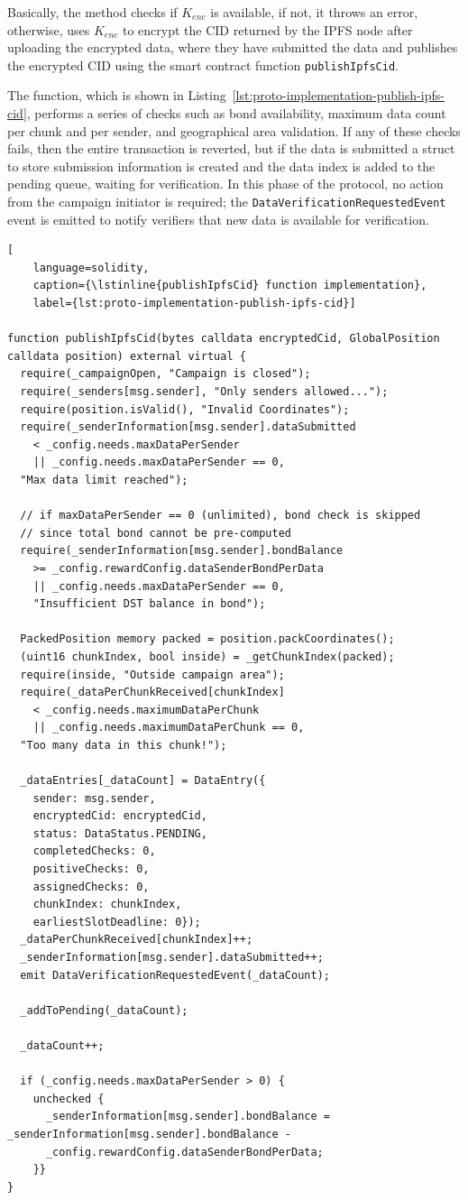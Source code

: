 Basically, the method checks if $K_{enc}$ is available, if not, it throws an error, otherwise, uses $K_{enc}$ to encrypt the CID returned by the IPFS node after uploading the encrypted data, where they have submitted the data and publishes the encrypted CID using the smart contract function \lstinline{publishIpfsCid}.

The function, which is shown in Listing~\ref{lst:proto-implementation-publish-ipfs-cid}, performs a series of checks such as bond availability, maximum data count per chunk and per sender, and geographical area validation.
If any of these checks fails, then the entire transaction is reverted, but if the data is submitted a struct to store submission information is created and the data index is added to the pending queue, waiting for verification.
In this phase of the protocol, no action from the campaign initiator is required; the \lstinline{DataVerificationRequestedEvent} event is emitted to notify verifiers that new data is available for verification.

\begin{lstlisting}[
    language=solidity,
    caption={\lstinline{publishIpfsCid} function implementation},
    label={lst:proto-implementation-publish-ipfs-cid}]

function publishIpfsCid(bytes calldata encryptedCid, GlobalPosition calldata position) external virtual {
  require(_campaignOpen, "Campaign is closed");
  require(_senders[msg.sender], "Only senders allowed...");
  require(position.isValid(), "Invalid Coordinates");
  require(_senderInformation[msg.sender].dataSubmitted
    < _config.needs.maxDataPerSender
    || _config.needs.maxDataPerSender == 0,
  "Max data limit reached");

  // if maxDataPerSender == 0 (unlimited), bond check is skipped
  // since total bond cannot be pre-computed
  require(_senderInformation[msg.sender].bondBalance
    >= _config.rewardConfig.dataSenderBondPerData
    || _config.needs.maxDataPerSender == 0,
    "Insufficient DST balance in bond");

  PackedPosition memory packed = position.packCoordinates();
  (uint16 chunkIndex, bool inside) = _getChunkIndex(packed);
  require(inside, "Outside campaign area");
  require(_dataPerChunkReceived[chunkIndex]
    < _config.needs.maximumDataPerChunk
    || _config.needs.maximumDataPerChunk == 0,
  "Too many data in this chunk!");

  _dataEntries[_dataCount] = DataEntry({
    sender: msg.sender,
    encryptedCid: encryptedCid,
    status: DataStatus.PENDING,
    completedChecks: 0,
    positiveChecks: 0,
    assignedChecks: 0,
    chunkIndex: chunkIndex,
    earliestSlotDeadline: 0});
  _dataPerChunkReceived[chunkIndex]++;
  _senderInformation[msg.sender].dataSubmitted++;
  emit DataVerificationRequestedEvent(_dataCount);

  _addToPending(_dataCount);

  _dataCount++;

  if (_config.needs.maxDataPerSender > 0) {
    unchecked {
      _senderInformation[msg.sender].bondBalance = _senderInformation[msg.sender].bondBalance -
      _config.rewardConfig.dataSenderBondPerData;
    }}
}
\end{lstlisting}

